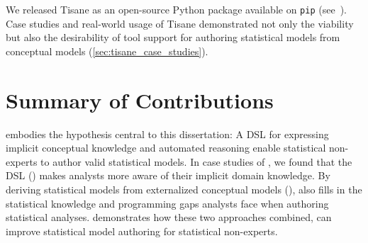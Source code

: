 We released Tisane as an open-source Python package
available on \texttt{pip} (see~\cite{tisaneWebsite}).
Case studies and
real-world usage of Tisane demonstrated not only the viability but also the
desirability of tool support for authoring statistical models from conceptual
models (\autoref{sec:tisane_case_studies}).







\section{Summary of Contributions}


\tisane embodies the hypothesis central to this dissertation: A DSL for
expressing implicit conceptual knowledge and automated reasoning enable
statistical non-experts to author valid statistical models. In case studies of
\tisane, we found that the DSL (\thesisChallengeExplicit) makes analysts more aware of
their implicit domain knowledge. By deriving statistical models from
externalized conceptual models (\thesisChallengeRep), \tisane also fills in the
statistical knowledge and programming gaps analysts face when authoring
statistical analyses. \tisane demonstrates how these two approaches combined,
can improve statistical model authoring for statistical non-experts. 


